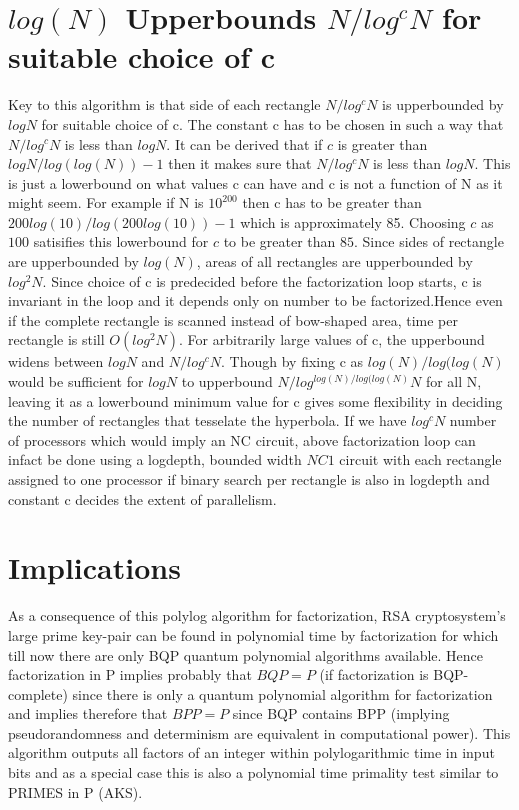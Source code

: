 \documentclass[11pt,onecolumn]{article}
\begin{document}
\section{$log(N)$ Upperbounds $N/log^{c}N$ for suitable choice of c}
Key to this algorithm is that side of each rectangle $N/log^{c}N$ is upperbounded by $log N$ for suitable choice of c. The constant c has to be chosen in such a way that $N/log^{c}N$ is less than $logN$. It can be derived that if $c$ is greater than $logN/log(log(N)) - 1$ then it makes sure that $N/log^{c}N$ is less than $logN$. This is just a lowerbound on what values c can have and c is not a function of N as it might seem. For example if N is $10^{200}$ then c has to be greater than $200log(10)/log(200log(10))-1$ which is approximately 85. Choosing $c$ as $100$ satisifies this lowerbound for $c$ to be greater than $85$. Since sides of rectangle are upperbounded by $log(N)$, areas of all rectangles are upperbounded by $log^{2}N$. Since choice of c is predecided before the factorization loop starts, c is invariant in the loop and it depends only on number to be factorized.Hence even if the complete rectangle is scanned instead of bow-shaped area, time per rectangle is still $O(log^{2}N)$. For arbitrarily large values of c, the upperbound widens between $logN$ and $N/log^{c}N$. Though by fixing c as $log(N)/log(log(N)$ would be sufficient for $logN$ to upperbound $N/log^{log(N)/log(log(N)}N$ for all N, leaving it as a lowerbound minimum value for c gives some flexibility in deciding the number of rectangles that tesselate the hyperbola. If we have $log^{c}N$ number of processors which would imply an NC circuit, above factorization loop can infact be done using a logdepth, bounded width $NC1$ circuit with each rectangle assigned to one processor if binary search per rectangle is also in logdepth and constant c decides the extent of parallelism.


\section{Implications}
As a consequence of this polylog algorithm for factorization, RSA cryptosystem's large prime key-pair can be found in polynomial time by factorization for which till now there are only BQP quantum polynomial algorithms available. Hence factorization in P implies probably that $BQP=P$ (if factorization is BQP-complete) since there is only a quantum polynomial algorithm for factorization and implies therefore that $BPP=P$ since BQP contains BPP (implying pseudorandomness and determinism are equivalent in computational power). This algorithm outputs all factors of an integer within polylogarithmic time in input bits and as a special case this is also a polynomial time primality test similar to PRIMES in P (AKS).
\end{document}
